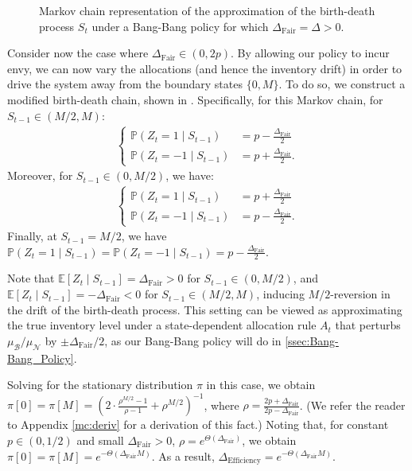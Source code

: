 \documentclass[mnsc,nonblindrev]{informs3}
\newcommand{\pr}{\mathbb{P}}
\newcommand{\NDist}{\mathcal{N}}
\newcommand{\BDist}{\mathcal{B}}
\newcommand{\Nmean}{\mu_{\NDist}}
\newcommand{\Bmean}{\mu_{\BDist}}
\newcommand{\ALG}{{Bang-Bang}\xspace}
\newcommand{\Exp}[1]{\mathbb{E} \left[ #1 \right]} %
\newcommand{\Deff}{\Delta_{\text{Efficiency}}\xspace}
\newcommand{\Dfair}{\Delta_{\text{Fair}}\xspace}
\begin{document}
\begin{figure}[!t]
{
}
    \caption{Markov chain representation of the approximation of the birth-death process ${S}_t$ under a Bang-Bang policy for which $\Dfair = \Delta > 0$.
    }
    \label{fig:biased_gamblers_ruin_chain}
\end{figure}

Consider now the case where $\Dfair \in (0,2p)$. By allowing our policy to incur envy, we can now vary the allocations (and hence the inventory drift) in order to drive the system away from the boundary states $\{0,M\}$.  To do so, we construct a modified birth-death chain, shown in . Specifically, for this Markov chain, for $S_{t-1} \in (M/2,M)$:
\begin{align*}
\begin{cases}
\pr({Z}_t=1 \mid S_{t-1})&=p-\frac{\Dfair}{2}\\
\pr({Z}_t=-1 \mid S_{t-1})&=p+\frac{\Dfair}{2}.
\end{cases}
\end{align*}
Moreover, for $S_{t-1} \in (0, M/2)$, we have:
\begin{align*}
\begin{cases}
\pr({Z}_t=1 \mid S_{t-1})&=p+\frac{\Dfair}{2} \\
\pr({Z}_t=-1 \mid S_{t-1})&=p-\frac{\Dfair}{2}.
\end{cases}
\end{align*}
Finally, at $S_{t-1} = M/2$, we have $\mathbb{P}(Z_t = 1 \mid S_{t-1}) = \mathbb{P}(Z_t = -1 \mid S_{t-1}) = p-\frac{\Dfair}{2}$.

Note that $\Exp{Z_t \mid S_{t-1}} = \Dfair > 0$ for $S_{t-1}  \in (0,M/2)$, and $\Exp{Z_t \mid S_{t-1}} = -\Dfair < 0$ {for $S_{t-1} \in (M/2,M)$}, inducing $M/2$-reversion in the drift of the birth-death process.  This setting can be viewed as approximating the true inventory level under a state-dependent allocation rule $A_t$ that perturbs $\Bmean / \Nmean$ by $\pm \Dfair/2$, as our \ALG policy will do in \cref{ssec:Bang-Bang_Policy}.

Solving for the stationary distribution $\pi$ in this case,
we obtain $\pi[0] = \pi[M] = \left(2\cdot\frac{\rho^{M/2}-1}{\rho-1}+\rho^{M/2}\right)^{-1}$, where $\rho = \frac{2p+\Dfair}{2p-\Dfair}$. (We refer the reader to Appendix \ref{mc:deriv} for a derivation of this fact.) Noting that, for constant $p \in (0,1/2)$ and small $\Dfair > 0$, $\rho = e^{\Theta(\Dfair)}$, we obtain \mbox{$\pi[0] = \pi[M] = e^{-\Theta(\Dfair M)}$}. As a result, $\Deff = e^{-\Theta(\Dfair M)}$.
\end{document}
